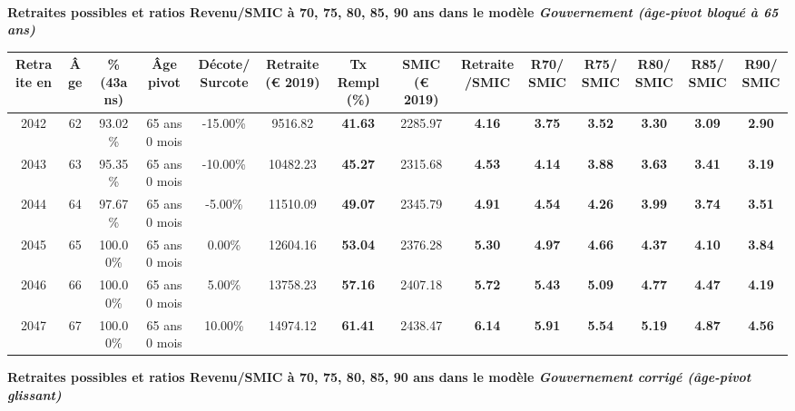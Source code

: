  ~\\{\bf \noindent Retraites possibles et ratios Revenu/SMIC à 70, 75, 80, 85, 90 ans dans le modèle \emph{Gouvernement (âge-pivot bloqué à 65 ans)}}  
 
\begin{adjustbox}{max width=\textwidth} 
\begin{tabular}[htb]{|c|c||c|c|c||c|c||c|c||c|c|c|c|c|} 
\hline 
 Retraite en &  Âge &  \%(43ans) &  Âge pivot &  Décote/Surcote &  Retraite (\euro{} 2019) &  Tx Rempl(\%) &  SMIC (\euro{} 2019) &  Retraite/SMIC &  R70/SMIC &  R75/SMIC &  R80/SMIC &  R85/SMIC &  R90/SMIC \\ 
\hline \hline 
 2042 &  62 &  93.02\% &  65 ans 0 mois &  -15.00\% &  9516.82 &  {\bf 41.63} &  2285.97 &  {\bf 4.16} &  {\bf 3.75} &  {\bf 3.52} &  {\bf 3.30} &  {\bf 3.09} &  {\bf 2.90} \\ 
\hline 
 2043 &  63 &  95.35\% &  65 ans 0 mois &  -10.00\% &  10482.23 &  {\bf 45.27} &  2315.68 &  {\bf 4.53} &  {\bf 4.14} &  {\bf 3.88} &  {\bf 3.63} &  {\bf 3.41} &  {\bf 3.19} \\ 
\hline 
 2044 &  64 &  97.67\% &  65 ans 0 mois &  -5.00\% &  11510.09 &  {\bf 49.07} &  2345.79 &  {\bf 4.91} &  {\bf 4.54} &  {\bf 4.26} &  {\bf 3.99} &  {\bf 3.74} &  {\bf 3.51} \\ 
\hline 
 2045 &  65 &  100.00\% &  65 ans 0 mois &  0.00\% &  12604.16 &  {\bf 53.04} &  2376.28 &  {\bf 5.30} &  {\bf 4.97} &  {\bf 4.66} &  {\bf 4.37} &  {\bf 4.10} &  {\bf 3.84} \\ 
\hline 
 2046 &  66 &  100.00\% &  65 ans 0 mois &  5.00\% &  13758.23 &  {\bf 57.16} &  2407.18 &  {\bf 5.72} &  {\bf 5.43} &  {\bf 5.09} &  {\bf 4.77} &  {\bf 4.47} &  {\bf 4.19} \\ 
\hline 
 2047 &  67 &  100.00\% &  65 ans 0 mois &  10.00\% &  14974.12 &  {\bf 61.41} &  2438.47 &  {\bf 6.14} &  {\bf 5.91} &  {\bf 5.54} &  {\bf 5.19} &  {\bf 4.87} &  {\bf 4.56} \\ 
\hline 
\hline 
\end{tabular} 
\end{adjustbox} 
 
 \vspace{0.1cm} 
{\bf \noindent Retraites possibles et ratios Revenu/SMIC à 70, 75, 80, 85, 90 ans dans le modèle \emph{Gouvernement corrigé (âge-pivot glissant)}}  
 
